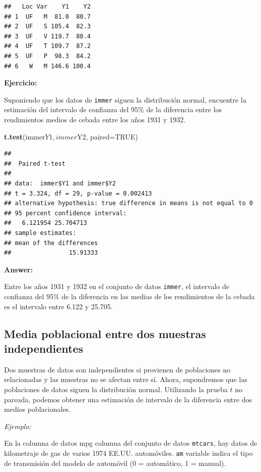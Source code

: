 \documentclass[]{article}
\newenvironment{Shaded}{\begin{snugshade}}{\end{snugshade}}
\newcommand{\KeywordTok}[1]{\textcolor[rgb]{0.13,0.29,0.53}{\textbf{{#1}}}}
\newcommand{\DataTypeTok}[1]{\textcolor[rgb]{0.13,0.29,0.53}{{#1}}}
\newcommand{\OtherTok}[1]{\textcolor[rgb]{0.56,0.35,0.01}{{#1}}}
\newcommand{\NormalTok}[1]{{#1}}
\numberwithin{equation}{section}
\begin{document}
\begin{verbatim}
##   Loc Var    Y1    Y2
## 1  UF   M  81.0  80.7
## 2  UF   S 105.4  82.3
## 3  UF   V 119.7  80.4
## 4  UF   T 109.7  87.2
## 5  UF   P  98.3  84.2
## 6   W   M 146.6 100.4
\end{verbatim}

\textbf{Ejercicio:}

Suponiendo que los datos de \texttt{immer} siguen la distribución
normal, encuentre la estimación del intervalo de confianza del 95\% de
la diferencia entre los rendimientos medios de cebada entre los años
1931 y 1932.

\begin{Shaded}
\begin{Highlighting}[]
\KeywordTok{t.test}\NormalTok{(immer$Y1, immer$Y2, }\DataTypeTok{paired=}\OtherTok{TRUE}\NormalTok{) }
\end{Highlighting}
\end{Shaded}

\begin{verbatim}
## 
##  Paired t-test
## 
## data:  immer$Y1 and immer$Y2
## t = 3.324, df = 29, p-value = 0.002413
## alternative hypothesis: true difference in means is not equal to 0
## 95 percent confidence interval:
##   6.121954 25.704713
## sample estimates:
## mean of the differences 
##                15.91333
\end{verbatim}

\textbf{Answer:}

Entre los años 1931 y 1932 en el conjunto de datos \texttt{immer}, el
intervalo de confianza del 95\% de la diferencia en las medias de los
rendimientos de la cebada es el intervalo entre 6.122 y 25.705.

\subsection{Media poblacional entre dos muestras
independientes}\label{media-poblacional-entre-dos-muestras-independientes}

Dos muestras de datos son independientes si provienen de poblaciones no
relacionadas y las muestras no se afectan entre sí. Ahora, supondremos
que las poblaciones de datos siguen la distribución normal. Utilizando
la prueba \(t\) no pareada, podemos obtener una estimación de intervalo
de la diferencia entre dos medios poblacionales.

\emph{Ejemplo:}

En la columna de datos mpg columna del conjunto de datos
\texttt{mtcars}, hay datos de kilometraje de gas de varios 1974 EE.UU.
automóviles. \texttt{am} variable indica el tipo de transmisión del
modelo de automóvil (0 = automático, 1 = manual).
\end{document}
